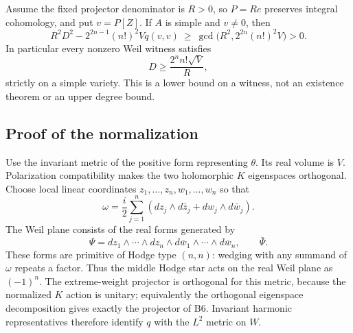 \documentclass[11pt,a4paper]{article}
\theoremstyle{definition}
\begin{document}
Assume the fixed projector denominator is \(R>0\), so \(P=Re\) preserves integral cohomology, and put \(v=P[Z]\). If \(A\) is simple and \(v\ne0\), then \[
 R^2D^2-2^{2n-1}(n!)^2Vq(v,v)
 \ \ge\ \gcd\bigl(R^2,2^{2n}(n!)^2V\bigr)>0.
 \tag{B26.2}
\] In particular every nonzero Weil witness satisfies \[
 D\ge\frac{2^n n!\sqrt V}{R},
 \tag{B26.3}
\] strictly on a simple variety. This is a lower bound on a witness, not an existence theorem or an upper degree bound.

\subsection{Proof of the normalization}\label{proof-of-the-normalization}

Use the invariant metric of the positive form representing \(\theta\). Its real volume is \(V\). Polarization compatibility makes the two holomorphic \(K\) eigenspaces orthogonal. Choose local linear coordinates \(z_1,\ldots,z_n,w_1,\ldots,w_n\) so that \[
 \omega=\frac i2\sum_{j=1}^n
 (dz_j\wedge d\bar z_j+dw_j\wedge d\bar w_j).
\] The Weil plane consists of the real forms generated by \[
 \Psi=dz_1\wedge\cdots\wedge dz_n
       \wedge d\bar w_1\wedge\cdots\wedge d\bar w_n,
 \qquad \bar\Psi.
\] These forms are primitive of Hodge type \((n,n)\): wedging with any summand of \(\omega\) repeats a factor. Thus the middle Hodge star acts on the real Weil plane as \((-1)^n\). The extreme-weight projector is orthogonal for this metric, because the normalized \(K\) action is unitary; equivalently the orthogonal eigenspace decomposition gives exactly the projector of B6. Invariant harmonic representatives therefore identify \(q\) with the \(L^2\) metric on \(W\).
\end{document}

